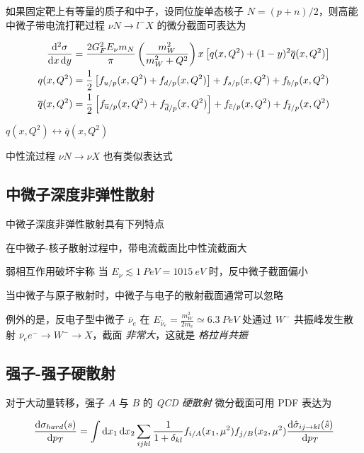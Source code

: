 如果固定靶上有等量的质子和中子，设同位旋单态核子 $N=(p+n)/2$，则高能中微子带电流打靶过程 $\nu N \to l^- X$ 的微分截面可表达为

\begin{align}
    \frac{\mathop{}\!\mathrm{d}^2 \sigma}{\mathop{}\!\mathrm{d} x \mathop{}\!\mathrm{d} y} &= \frac{2 G_F^2 E_\nu m_N}{\pi} \left(\frac{m_W^2}{m_W^2+Q^2}\right) x \left[q(x, Q^2)+(1-y)^2 \overline{q}(x, Q^2)\right] \\
    q(x, Q^2) &= \frac{1}{2} \left[f_{u/p}(x, Q^2) + f_{d/p}(x, Q^2)\right] + f_{s/p}(x, Q^2) + f_{b/p}(x, Q^2) \\
    \overline{q}(x, Q^2) &= \frac{1}{2} \left[f_{\overline{u}/p}(x, Q^2) + f_{\overline{d}/p}(x, Q^2)\right] + f_{\overline{c}/p}(x, Q^2) + f_{\overline{t}/p}(x, Q^2)
\end{align}

$q(x, Q^2) \leftrightarrow \overline{q}(x, Q^2)$

中性流过程 $\nu N \to \nu X$ 也有类似表达式

\subsection{中微子深度非弹性散射}

中微子深度非弹性散射具有下列特点

在中微子-核子散射过程中，带电流截面比中性流截面大

弱相互作用破坏宇称 当 $E_\nu \lesssim \qty{1}{PeV}=\qty{1015}{eV}$ 时，反中微子截面偏小

当中微子与原子散射时，中微子与电子的散射截面通常可以忽略

例外的是，反电子型中微子 $\overline{\nu}_e$ 在 $E_{\overline{\nu}_e}=\frac{m_W^2}{2 m_e} \simeq 6.3\ PeV$ 处通过 $W^-$ 共振峰发生散射 $\overline{\nu}_e e^- \to W^- \to X$，截面 \emph{非常大}，这就是 \emph{格拉肖共振}

\subsection{强子-强子硬散射}

对于大动量转移，强子 $A$ 与 $B$ 的 \emph{QCD 硬散射} 微分截面可用 PDF 表达为

\begin{equation}
    \frac{\mathop{}\!\mathrm{d}\sigma_{hard}(s)}{\mathop{}\!\mathrm{d} p_T} = \int \mathop{}\!\mathrm{d} x_1 \mathop{}\!\mathrm{d} x_2 \sum_{ijkl} \frac{1}{1+\delta_{kl}} f_{i/A}(x_1, \mu^2) f_{j/B}(x_2, \mu^2) \frac{\mathop{}\!\mathrm{d} \hat{\sigma}_{ij \to kl}(\hat{s})}{\mathop{}\!\mathrm{d} p_T}
\end{equation}

